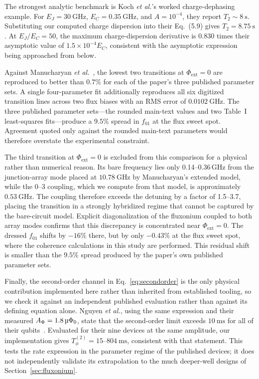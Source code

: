\documentclass{SciPost}
\providecommand{\upmu}{\text{\fontencoding{TS1}\selectfont\char181}}
\begin{document}
The strongest analytic benchmark is Koch \emph{et al.}'s worked charge-dephasing example. For
$E_J=\SI{30}{\giga\hertz}$, $E_C=\SI{0.35}{\giga\hertz}$, and $A=10^{-4}$, they report
$T_2\sim\SI{8}{\second}$. Substituting our computed charge dispersion into their Eq.~(5.9) gives
$T_2=\SI{8.75}{\second}$. At $E_J/E_C=50$, the maximum charge-dispersion derivative is $0.830$
times their asymptotic value of $1.5\times10^{-4}E_C$, consistent with the asymptotic expression
being approached from below.

Against Manucharyan \emph{et al.}~\cite{manucharyan2009}, the lowest two transitions at
$\Phi_{\mathrm{ext}}=0$ are reproduced to better than $0.7\%$ for each of the paper's three
published parameter sets. A single four-parameter fit additionally reproduces all six digitized
transition lines across two flux biases with an RMS error of $\SI{0.0102}{\giga\hertz}$. The three
published parameter sets---the rounded main-text values and two Table~I least-squares fits---produce
a $9.5\%$ spread in $f_{01}$ at the flux sweet spot. Agreement quoted only against the rounded
main-text parameters would therefore overstate the experimental constraint.

The third transition at $\Phi_{\mathrm{ext}}=0$ is excluded from this comparison for a physical
rather than numerical reason. Its bare frequency lies only 0.14--0.36\,GHz from the junction-array
mode placed at $\SI{10.78}{\giga\hertz}$ by Manucharyan's extended model, while the 0--3 coupling,
which we compute from that model, is approximately $\SI{0.53}{\giga\hertz}$. The coupling therefore
exceeds the detuning by a factor of 1.5--3.7, placing the transition in a strongly hybridized regime
that cannot be captured by the bare-circuit model. Explicit diagonalization of the fluxonium coupled
to both array modes confirms that this discrepancy is concentrated near $\Phi_{\mathrm{ext}}=0$. The
dressed $f_{01}$ shifts by $-16\%$ there, but by only $-0.43\%$ at the flux sweet spot, where the
coherence calculations in this study are performed. This residual shift is smaller than the $9.5\%$
spread produced by the paper's own published parameter sets.

Finally, the second-order channel in Eq.~\eqref{eq:secondorder} is the only physical contribution
implemented here rather than inherited from established tooling, so we check it against an
independent published evaluation rather than against its defining equation alone. Nguyen
\emph{et al.}, using the same expression and their measured $A_\Phi=1.8\,\upmu\Phi_0$, state that
the second-order limit exceeds $\SI{10}{\milli\second}$ for all of their qubits~\cite{nguyen2019}.
Evaluated for their nine devices at the same amplitude, our implementation gives $T_{\phi}^{(2)}=15$--$\SI{804}{\milli\second}$, consistent with that statement.
This tests the rate expression in the parameter regime of the published devices; it does not
independently validate its extrapolation to the much deeper-well designs of
Section~\ref{sec:fluxonium}.
\end{document}
